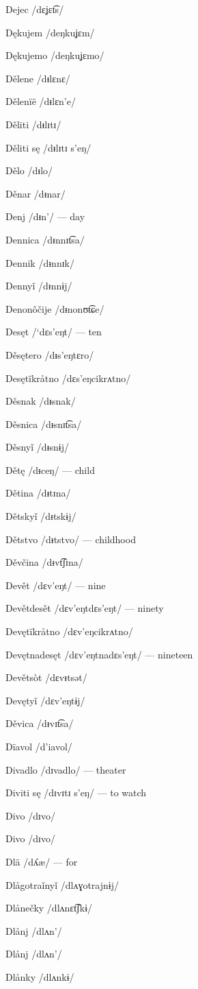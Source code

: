 Dejec /dɛʝɛt͡s/

Dękujem /deŋkuʝɛm/

Dękujemo /deŋkuʝɛmo/

Dělene /dᵻlɛnɛ/

Dělenïë /dᵻlɛn’e/

Děliti /dᵻlɪtɪ/

Děliti sę /dᵻlɪtɪ s’eŋ/

Dělo /dᵻlo/

Děnar /dᵻnar/

Denj /dᵻn’/ — day

Dennica /dᵻnnɪt͡sa/

Dennik /dᵻnnɪk/

Dennyǐ /dᵻnnɨj/

Denonôčije /dᵻnonʊt͡ɕe/

Desęt /`dɛs’eŋt/ — ten

Děsętero /dᵻs’eŋtɛro/

Desętïkråtno /dɛs’eŋcikrʌtno/

Děsnak /dᵻsnak/

Děsnica /dᵻsnɪt͡sa/

Děsnyǐ /dᵻsnɨj/

Dětę /dᵻceŋ/ — child

Dětina /dᵻtɪna/

Dětskyǐ /dᵻtskɨj/

Dětstvo /dᵻtstvo/ — childhood

Děvčina /dᵻvt͡ʃɪna/

Devět /dɛv’eŋt/ — nine

Devětdesět /dɛv’eŋtdɛs’eŋt/ — ninety

Devętïkråtno /dɛv’eŋcikrʌtno/

Devętnadesęt /dɛv’eŋtnadɛs’eŋt/ — nineteen

Devětsòt /dɛvᵻtsət/

Devętyǐ /dɛv’eŋtɨj/

Děvica /dᵻvɪt͡sa/

Dïavol /d’iavol/

Divadlo /dɪvadlo/ — theater

Diviti sę /dɪvɪtɪ s’eŋ/ — to watch

Divo /dɪvo/

Divo /dɪvo/

Dlä /dʎæ/ — for

Dlågotraǐnyǐ /dlʌɣotrajnɨj/

Dlånečky /dlʌnɛt͡ʃkɨ/

Dlånj /dlʌn’/

Dlånj /dlʌn’/

Dlånky /dlʌnkɨ/

